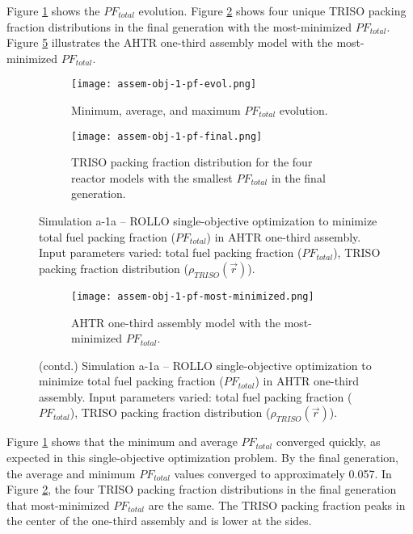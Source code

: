 Figure \ref{fig:assem-obj-1-pf-evol} shows the $PF_{total}$ evolution.
Figure \ref{fig:assem-obj-1-pf-final} shows four unique TRISO packing fraction distributions 
in the final generation with the most-minimized $PF_{total}$. 
Figure \ref{fig:assem-obj-1-pf-most-minimized} illustrates the \gls{AHTR} one-third 
assembly model with the most-minimized $PF_{total}$.
\begin{figure}[htbp!]
    \centering
    \begin{subfigure}{\textwidth}
        \texttt{[image: assem-obj-1-pf-evol.png]}
        \caption{Minimum, average, and maximum $PF_{total}$ evolution.}
        \label{fig:assem-obj-1-pf-evol} 
    \end{subfigure}
    \begin{subfigure}{\textwidth}
        \texttt{[image: assem-obj-1-pf-final.png]}
        \caption{TRISO packing fraction distribution for the four reactor models with the 
        smallest $PF_{total}$ in the final generation.}
        \label{fig:assem-obj-1-pf-final} 
    \end{subfigure}
    \caption{Simulation a-1a -- ROLLO single-objective optimization to minimize total 
    fuel packing fraction ($PF_{total}$) in \gls{AHTR} one-third assembly. 
    Input parameters varied: total fuel packing fraction 
    ($PF_{total}$), \gls{TRISO} packing fraction distribution ($\rho_{TRISO}(\vec{r})$).}
    \label{fig:assem-obj-1-pf}
\end{figure}
\begin{figure}[htbp!]
    \ContinuedFloat
    \centering
    \begin{subfigure}{0.7\textwidth}
        \texttt{[image: assem-obj-1-pf-most-minimized.png]}
        \caption{\gls{AHTR} one-third assembly model with the most-minimized 
        $PF_{total}$.}
        \label{fig:assem-obj-1-pf-most-minimized} 
    \end{subfigure}
    \caption{(contd.) Simulation a-1a -- ROLLO single-objective optimization to minimize total 
    fuel packing fraction ($PF_{total}$) in \gls{AHTR} one-third assembly. 
    Input parameters varied: total fuel packing fraction 
    ($PF_{total}$), \gls{TRISO} packing fraction distribution ($\rho_{TRISO}(\vec{r})$).}
\end{figure}

Figure \ref{fig:assem-obj-1-pf-evol} shows that the minimum and average $PF_{total}$ 
converged quickly, as expected in this single-objective optimization problem.
By the final generation, the average and minimum $PF_{total}$
values converged to approximately 0.057. 
In Figure \ref{fig:assem-obj-1-pf-final}, the four TRISO packing fraction distributions 
in the final generation that most-minimized $PF_{total}$ are the same.
The TRISO packing fraction peaks in the center of the one-third assembly and is 
lower at the sides. 

